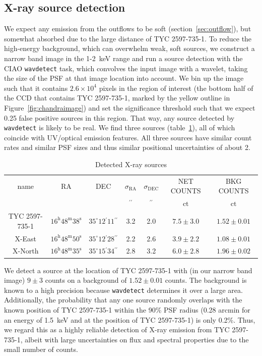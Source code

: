 \documentclass[linenumbers]{aastex631}
\begin{document}
\subsection{X-ray source detection}
\label{sec:xraydetection}
We expect any emission from the outflows to be soft (section~\ref{sec:outflow}), but somewhat absorbed due to the large distance of TYC 2597-735-1. To reduce the high-energy background, which can overwhelm weak, soft sources, we construct a narrow band image in the 1-2~keV range
and run a source detection with the CIAO \texttt{wavdetect} task, which convolves the input image with a wavelet, taking the size of the PSF at that image location into account. We bin up the image such that it contains $2.6\times10^4$ pixels in the region of interest (the bottom half of the CCD that contains TYC 2597-735-1, marked by the yellow outline in Figure~\ref{fig:chandraimage}) and set the significance threshold such that we expect 0.25 false positive sources in this region. That way, any source detected by \texttt{wavdetect} is likely to be real. We find three sources (table~\ref{tab:src}), all of which coincide with UV/optical emission features. All three sources have similar count rates and similar PSF sizes and thus similar positional uncertainties of about 2\arcsec{}.

\begin{table}
\caption{Detected X-ray sources\label{tab:src}}
\begin{tabular}{ccccccc}
\hline \hline
name & RA & DEC & $\sigma_\mathrm{RA}$ & $\sigma_\mathrm{DEC}$ & NET COUNTS & BKG COUNTS\\
 &  &  & $\mathrm{{}^{\prime\prime}}$ & $\mathrm{{}^{\prime\prime}}$ & $\mathrm{ct}$ & $\mathrm{ct}$ \\
\hline
TYC 2597-735-1 & $16^\mathrm{h}48^\mathrm{m}38^\mathrm{s}$ & $35^\circ12{}^\prime11{}^{\prime\prime}$ & 3.2 & 2.0 & $7.5 \pm 3.0$ & $1.52 \pm 0.01 $\\
X-East & $16^\mathrm{h}48^\mathrm{m}50^\mathrm{s}$ & $35^\circ12{}^\prime28{}^{\prime\prime}$ & 2.2 & 2.6 & $3.9 \pm 2.2$ & $1.08 \pm 0.01 $\\
X-North & $16^\mathrm{h}48^\mathrm{m}35^\mathrm{s}$ & $35^\circ15{}^\prime34{}^{\prime\prime}$ & 2.8 & 3.2 & $6.0 \pm 2.8$ & $1.96 \pm 0.02$ \\
\hline
\end{tabular}
\end{table}


We detect a source at the location of TYC 2597-735-1 with (in our narrow band image) $9\pm3$ counts on a background of $1.52\pm0.01$ counts. The background is known to a high precision because \texttt{wavdetect} determines it over a large area. Additionally, the probability that any one source randomly overlaps with the known position of TYC 2597-735-1 within the 90\% PSF radius (0.28 arcmin for an energy of 1.5~keV and at the position of TYC 2597-735-1) is only 0.2\%. Thus, we regard this as a highly reliable detection of X-ray emission from TYC 2597-735-1, albeit with large uncertainties on flux and spectral properties due to the small number of counts.
\end{document}
